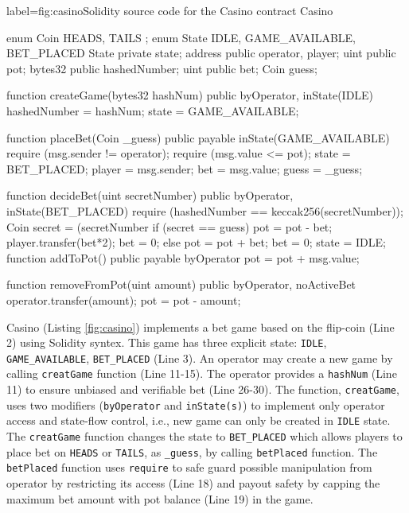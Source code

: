 \documentclass[a4paper,UKenglish,cleveref, autoref, thm-restate]{oasics-v2021}
\begin{document}
\begin{solidity}{label={fig:casino}}{Solidity source code for the Casino}
	contract Casino {
		enum Coin { HEADS, TAILS } ;
		enum State { IDLE, GAME_AVAILABLE,  BET_PLACED }
		State private state; 
		address public operator, player;
		uint public pot;
		bytes32 public hashedNumber;
		uint public bet;
		Coin guess;

		function createGame(bytes32 hashNum) 
		public byOperator, inState(IDLE) { 
		hashedNumber = hashNum; 
		state = GAME_AVAILABLE;
		}

		function placeBet(Coin _guess) public payable inState(GAME_AVAILABLE) {
		require (msg.sender != operator);
		require (msg.value <= pot);
		state = BET_PLACED; 
		player = msg.sender; 
		bet = msg.value; 
		guess = _guess; 
	}

 		function decideBet(uint secretNumber) 
		public byOperator, inState(BET_PLACED) { 
			require (hashedNumber == keccak256(secretNumber)); 
			Coin secret = (secretNumber %
			if (secret == guess) { pot = pot - bet;  player.transfer(bet*2);  bet = 0;} 
			else {
			pot = pot + bet; bet = 0;
				}
		state = IDLE;}
		function addToPot() public payable byOperator { pot = pot + msg.value;}

		function removeFromPot(uint amount) public byOperator, noActiveBet { operator.transfer(amount);  pot = pot - amount;}
		}
\end{solidity}
Casino (Listing \ref{fig:casino}) implements a bet game based on the flip-coin (Line 2) using Solidity syntex. 
%
This game has three explicit state: \texttt{IDLE}, \texttt{GAME\_AVAILABLE}, \texttt{BET\_PLACED} (Line 3).
%
An operator may create a new game by calling \texttt{creatGame} function (Line 11-15).
%
The operator provides a \texttt{hashNum} (Line 11) to ensure unbiased and verifiable bet (Line 26-30).
%
The function,  \texttt{creatGame}, uses two modifiers (\texttt{byOperator} and \texttt{inState(s)}) to implement only operator access and state-flow control, i.e., new game can only be created in \texttt{IDLE} state.
%
The \texttt{creatGame} function  changes the state to \texttt{BET\_PLACED} which allows players to place bet on \texttt{HEADS} or \texttt{TAILS}, as \texttt{\_guess}, by calling \texttt{betPlaced} function.
%
The \texttt{betPlaced} function uses \texttt{require} to safe guard possible manipulation from operator by restricting its access (Line 18) and payout safety by capping the maximum bet amount with pot balance (Line 19) in the game.
%
\end{document}
